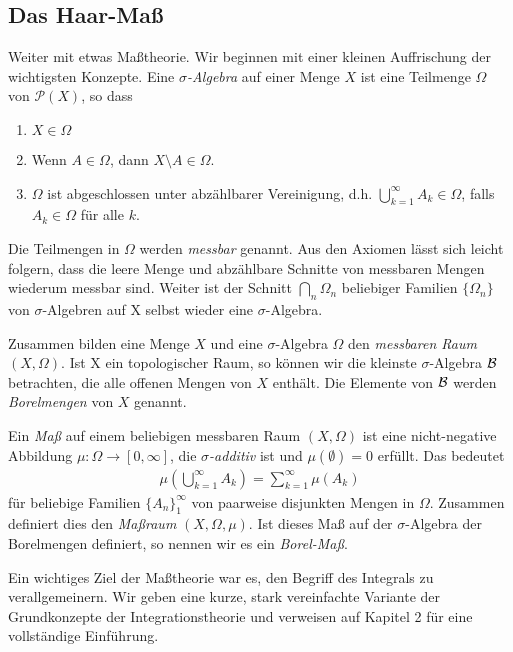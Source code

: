 \subsection{Das Haar-Maß}
	Weiter mit etwas Maßtheorie. 
	Wir beginnen mit einer kleinen Auffrischung der wichtigsten Konzepte. 
	Eine \emph{$\sigma$-Algebra} auf einer Menge $X$ ist eine Teilmenge $\Omega$ von $\mathcal{P}(X)$, so dass
	\begin{enumerate}[label=(\roman*)]
		\item $X \in \Omega$
		\item Wenn $A \in \Omega$, dann $X\setminus A \in \Omega$.
		\item $\Omega$ ist abgeschlossen unter abzählbarer Vereinigung, d.h. $\bigcup_{k=1}^{\infty} A_k \in \Omega$, falls $A_k \in \Omega$ für alle $k$.
	\end{enumerate}
	Die Teilmengen in $\Omega$ werden \emph{messbar} genannt. 
	Aus den Axiomen lässt sich leicht folgern, dass die leere Menge und abzählbare Schnitte von messbaren Mengen wiederum messbar sind. 
	Weiter ist der Schnitt $\bigcap_n \Omega_n$ beliebiger Familien $\{\Omega_n\}$ von $\sigma$-Algebren auf X selbst wieder eine $\sigma$-Algebra.
	
	Zusammen bilden eine Menge $X$ und eine $\sigma$-Algebra $\Omega$ den \emph{messbaren Raum} $(X, \Omega)$. 
	Ist X ein topologischer Raum, so können wir die kleinste $\sigma$-Algebra $\mathcal{B}$ betrachten, die alle offenen Mengen von $X$ enthält. 
	Die Elemente von $\mathcal{B}$ werden \emph{Borelmengen} von $X$ genannt.
	
	Ein \emph{Maß} auf einem beliebigen messbaren Raum $(X, \Omega)$ ist eine nicht-negative Abbildung $\mu: \Omega \to [0, \infty]$, die \emph{$\sigma$-additiv} ist und $\mu(\emptyset) = 0$ erfüllt. 
	Das bedeutet
	\begin{align*}
		\mu\left( \bigcup_{k=1}^{\infty} A_k\right) = \sum_{k=1}^{\infty} \mu (A_k)
	\end{align*}
	für beliebige Familien $\{A_n\}_1^\infty$ von paarweise disjunkten Mengen in $\Omega$.
	Zusammen definiert dies den \emph{Maßraum} $(X, \Omega, \mu)$.
	Ist dieses Maß auf der $\sigma$-Algebra der Borelmengen definiert, so nennen wir es ein \emph{Borel-Maß}.
	
	Ein wichtiges Ziel der Maßtheorie war es, den Begriff des Integrals zu verallgemeinern.
	Wir geben eine kurze, stark vereinfachte Variante der Grundkonzepte der Integrationstheorie und verweisen auf \textcite{folland} Kapitel 2 für eine vollständige Einführung.
	
